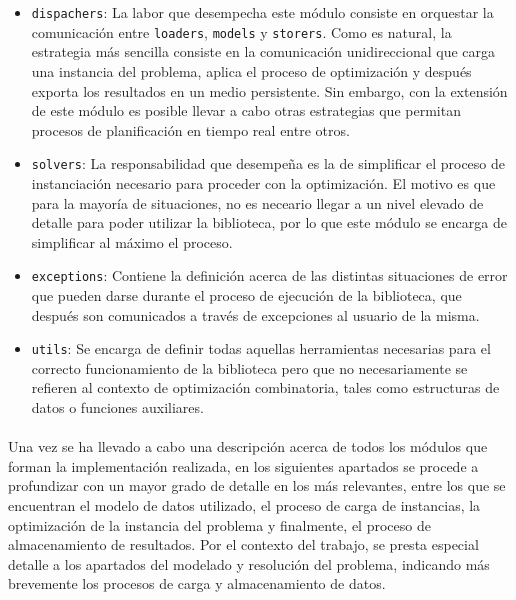 \documentclass{subfiles}
\begin{document}
          \begin{itemize}

              \item \texttt{dispachers}: La labor que desempecha este módulo consiste en orquestar la comunicación entre \texttt{loaders}, \texttt{models} y \texttt{storers}. Como es natural, la estrategia más sencilla consiste en la comunicación unidireccional que carga una instancia del problema, aplica el proceso de optimización y después exporta los resultados en un medio persistente. Sin embargo, con la extensión de este módulo es posible llevar a cabo otras estrategias que permitan procesos de planificación en tiempo real entre otros.

            \item \texttt{solvers}: La responsabilidad que desempeña es la de simplificar el proceso de instanciación necesario para proceder con la optimización. El motivo es que para la mayoría de situaciones, no es neceario llegar a un nivel elevado de detalle para poder utilizar la biblioteca, por lo que este módulo se encarga de simplificar al máximo el proceso.

            \item \texttt{exceptions}: Contiene la definición acerca de las distintas situaciones de error que pueden darse durante el proceso de ejecución de la biblioteca, que después son comunicados a través de excepciones al usuario de la misma.

            \item \texttt{utils}: Se encarga de definir todas aquellas herramientas necesarias para el correcto funcionamiento de la biblioteca pero que no necesariamente se refieren al contexto de optimización combinatoria, tales como estructuras de datos o funciones auxiliares.

          \end{itemize}

          \paragraph{}
          Una vez se ha llevado a cabo una descripción acerca de todos los módulos que forman la implementación realizada, en los siguientes apartados se procede a profundizar con un mayor grado de detalle en los más relevantes, entre los que se encuentran el modelo de datos utilizado, el proceso de carga de instancias, la optimización de la instancia del problema y finalmente, el proceso de almacenamiento de resultados. Por el contexto del trabajo, se presta especial detalle a los apartados del modelado y resolución del problema, indicando más brevemente los procesos de carga y almacenamiento de datos.
\end{document}
